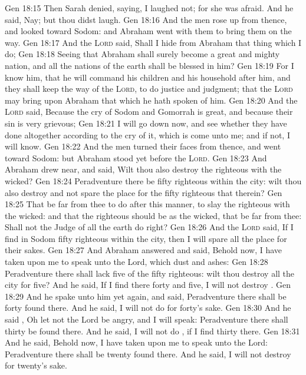 \vs Gen 18:15 Then Sarah denied, saying, I laughed not; for she was afraid. And he said, Nay; but thou didst laugh.
\vs Gen 18:16 And the men rose up from thence, and looked toward Sodom: and Abraham went with them to bring them on the way.
\vs Gen 18:17 And the \textsc{Lord} said, Shall I hide from Abraham that thing which I do;
\vs Gen 18:18 Seeing that Abraham shall surely become a great and mighty nation, and all the nations of the earth shall be blessed in him?
\vs Gen 18:19 For I know him, that he will command his children and his household after him, and they shall keep the way of the \textsc{Lord}, to do justice and judgment; that the \textsc{Lord} may bring upon Abraham that which he hath spoken of him.
\vs Gen 18:20 And the \textsc{Lord} said, Because the cry of Sodom and Gomorrah is great, and because their sin is very grievous;
\vs Gen 18:21 I will go down now, and see whether they have done altogether according to the cry of it, which is come unto me; and if not, I will know.
\vs Gen 18:22 And the men turned their faces from thence, and went toward Sodom: but Abraham stood yet before the \textsc{Lord}.
\vs Gen 18:23 And Abraham drew near, and said, Wilt thou also destroy the righteous with the wicked?
\vs Gen 18:24 Peradventure there be fifty righteous within the city: wilt thou also destroy and not spare the place for the fifty righteous that  therein?
\vs Gen 18:25 That be far from thee to do after this manner, to slay the righteous with the wicked: and that the righteous should be as the wicked, that be far from thee: Shall not the Judge of all the earth do right?
\vs Gen 18:26 And the \textsc{Lord} said, If I find in Sodom fifty righteous within the city, then I will spare all the place for their sakes.
\vs Gen 18:27 And Abraham answered and said, Behold now, I have taken upon me to speak unto the Lord, which  dust and ashes:
\vs Gen 18:28 Peradventure there shall lack five of the fifty righteous: wilt thou destroy all the city for  five? And he said, If I find there forty and five, I will not destroy .
\vs Gen 18:29 And he spake unto him yet again, and said, Peradventure there shall be forty found there. And he said, I will not do  for forty's sake.
\vs Gen 18:30 And he said , Oh let not the Lord be angry, and I will speak: Peradventure there shall thirty be found there. And he said, I will not do , if I find thirty there.
\vs Gen 18:31 And he said, Behold now, I have taken upon me to speak unto the Lord: Peradventure there shall be twenty found there. And he said, I will not destroy  for twenty's sake.
